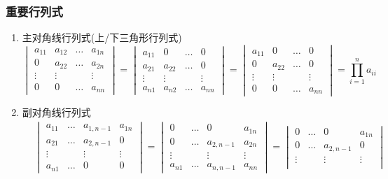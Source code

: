 \subsubsection{重要行列式}
\begin{enumerate}
\item 主对角线行列式(上/下三角形行列式)
\begin{equation*}
\begin{vmatrix}
a_{11} & a_{12} & \dots & a_{1n} \\
0 & a_{22} & \dots & a_{2n} \\
\vdots & \vdots & & \vdots \\
0 & 0 & \dots & a_{nn}
\end{vmatrix}=
\begin{vmatrix}
a_{11} & 0 & \dots & 0 \\
a_{21} & a_{22} & \dots & 0 \\
\vdots & \vdots & & \vdots \\
a_{n1} & a_{n2} & \dots & a_{nn}
\end{vmatrix}=
\begin{vmatrix}
a_{11} & 0 & \dots & 0 \\
0 & a_{22} & \dots & 0 \\
\vdots & \vdots & & \vdots \\
0 & 0 & \dots & a_{nn}
\end{vmatrix}=
\prod_{i=1}^{n}a_{ii}
\end{equation*}
\item 副对角线行列式
\begin{equation*}
\begin{aligned}
& \begin{vmatrix}
  a_{11} & \dots & a_{1,n-1} & a_{1n} \\
  a_{21} & \dots & a_{2,n-1} & 0 \\
  \vdots & & \vdots & \vdots \\
  a_{n1} & \dots & 0 & 0
\end{vmatrix}=
\begin{vmatrix}
0 & \dots & 0 & a_{1n} \\
0 & \dots & a_{2,n-1} & a_{2n} \\
\vdots & & \vdots & \vdots \\
a_{n1} & \dots & a_{n,n-1} & a_{nn}
\end{vmatrix}=
\begin{vmatrix}
0 & \dots & 0 & a_{1n} \\
0 & \dots & a_{2,n-1} & 0 \\
\vdots & & \vdots & \vdots \\

\end{vmatrix}
\end{aligned}
\end{equation*}
\end{enumerate}
